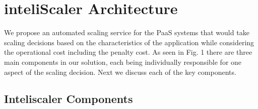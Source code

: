 \section{inteliScaler Architecture}
We propose an automated scaling service for the PaaS systems that would take scaling decisions based on the characteristics of the application while considering the operational cost including the penalty cost. As seen in Fig. 1 there are three main components in our solution, each being individually responsible for one aspect of the scaling decision. Next we discuss each of the key components.\\

\subsection{Inteliscaler Components}